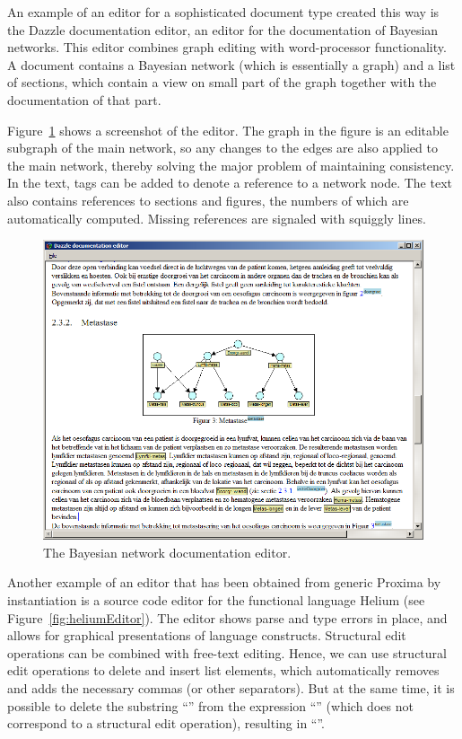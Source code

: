 \documentclass[10pt]{article}
\begin{document}
An example of an editor for a sophisticated document type created this way is the Dazzle documentation editor, an editor for the documentation of Bayesian networks. This editor combines graph editing with word-processor functionality. A document contains a Bayesian network (which is essentially a graph) and a list of sections, which contain a view on small part of the graph together with the documentation of that part. 

Figure~\ref{fig:bayesDocEditor} shows a screenshot of the editor. The graph in the figure is an editable subgraph of the main network, so any changes to the edges are also applied to the main network, thereby solving the major problem of maintaining consistency. In the text, tags can be added to denote a reference to a network node. The text also contains references to sections and figures, the numbers of which are automatically computed. Missing references are signaled with squiggly lines.

\begin{figure}[t]
\begin{center}
\includegraphics[width=12cm]{images/subgraph}
\end{center}
\caption{The Bayesian network documentation editor.}
\label{fig:bayesDocEditor}
\end{figure}

Another example of an editor that has been obtained from generic Proxima by instantiation is a source code editor for the functional language Helium (see Figure~\ref{fig:heliumEditor}). The editor shows parse and type errors in place, and allows for graphical presentations of language constructs. Structural edit operations can be combined with free-text editing. Hence, we can use structural edit operations to delete and insert list elements, which automatically removes and adds the necessary commas (or other separators). But at the same time, it is possible to delete the substring ``'' from the expression ``\p{[ 1+2, 3]}'' (which does not correspond to a structural edit operation), resulting in ``\p{[ 13 ]}''.
\end{document}
